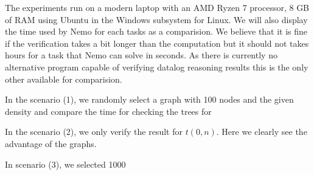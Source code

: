 The experiments run on a modern laptop with an AMD Ryzen 7 processor, 8 GB of RAM using Ubuntu in the Windows subsystem for Linux. We will also display the time used by Nemo for each tasks as a comparision. We believe that it is fine if the verification takes a bit longer than the computation but it should not takes hours for a task that Nemo can solve in seconds. As there is currently no alternative program capable of verifying datalog reasoning results this is the only other available for comparision.

In the scenario (1), we randomly select a graph with 100 nodes and the given density and compare the time for checking the trees for 


In the scenario (2), we only verify the result for $t(0,n)$. Here we clearly see the advantage of the graphs. 

In scenario (3), we selected 1000
